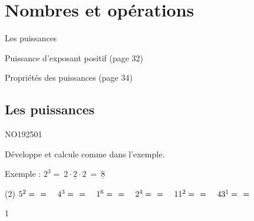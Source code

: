 \documentclass[a4paper,11pt]{report}
\begin{document}
\newcommand{\chapterName}{Nombres et opérations}
\newcommand{\serieName}{Les puissances}

\chapter*{\chapterName}
\thispagestyle{empty}

\begin{amL}{\serieName}{
\item Puissance d'exposant positif (page 32)
\item Propriétés des puissances (page 34)
}\end{amL}

\section*{\serieName}
\setcounter{page}{1}








\begin{QSJ}{57}{1}
\end{QSJ}

\begin{exol}{NO192}{50}{1} %
\end{exol}

\begin{exop}{
Développe et calcule comme dans l'exemple.

Exemple : $2^3=\underline{~2\cdot2\cdot2~}=\underline{~8~}$
\begin{tasks}(2)
    \task $5^2=~\hrulefill~=$ ~
    \task $4^3=~\hrulefill~=$ ~
    \task $1^6=~\hrulefill~=$ ~
    \task $2^4=~\hrulefill~=$ ~
    \task $11^2=~\hrulefill~=$ ~
    \task $43^1=~\hrulefill~=$ ~
\end{tasks}
}{1}
\end{exop}
\end{document}
